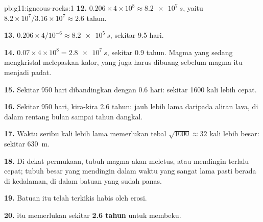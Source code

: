 \begin{solution}{pb:g11:igneous-rocks:1}
\textbf{12.} $0.206 \times 4 \times 10^8 \approx \qty{8.2e7}{s}$, yaitu
$8.2 \times 10^7 / 3.16 \times 10^7 \approx 2.6$ tahun.

\textbf{13.} $0.206 \times 4/10^{-6} \approx \qty{8.2e5}{s}$, sekitar 9.5
hari.

\textbf{14.} $0.07 \times 4 \times 10^8 = \qty{2.8e7}{s}$, sekitar 0.9 tahun.
Magma yang sedang mengkristal melepaskan kalor, yang juga harus dibuang
sebelum magma itu menjadi padat.

\textbf{15.} Sekitar 950 hari dibandingkan dengan 0.6 hari: sekitar 1600 kali
lebih cepat.

\textbf{16.} Sekitar 950 hari, kira-kira 2.6 tahun: jauh lebih lama daripada
aliran lava, di dalam rentang bulan sampai tahun  dangkal.

\textbf{17.} Waktu seribu kali lebih lama memerlukan tebal $\sqrt{1000} \approx
32$ kali lebih besar: sekitar \qty{630}{m}.

\textbf{18.} Di dekat permukaan, tubuh magma akan meletus, atau mendingin
terlalu cepat; tubuh besar yang mendingin dalam waktu yang sangat lama pasti
berada di kedalaman, di dalam batuan yang sudah panas.

\textbf{19.} Batuan itu telah terkikis habis oleh erosi.

\textbf{20.}  itu memerlukan sekitar \textbf{2.6 tahun} untuk membeku.
\end{solution}
